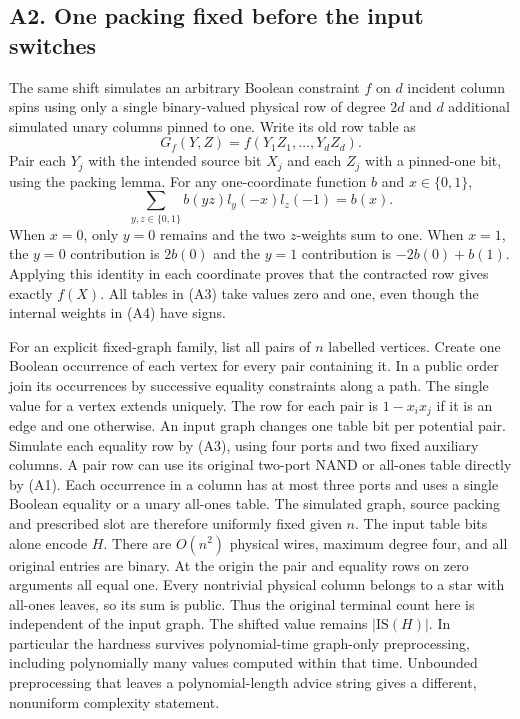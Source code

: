 \documentclass[11pt,a4paper]{article}
\begin{document}
\subsection{A2. One packing fixed before the input
switches}\label{v9-a2-one-packing-fixed-before-the-input-switches}

The same shift simulates an arbitrary Boolean constraint \(f\) on \(d\)
incident column spins using only a single binary-valued physical row of
degree \(2d\) and \(d\) additional simulated unary columns pinned to
one. Write its old row table as \[
       G_f(Y,Z)= f(Y_1Z_1,\ldots,Y_dZ_d).
\tag{A3}
\] Pair each \(Y_j\) with the intended source bit \(X_j\) and each
\(Z_j\) with a pinned-one bit, using the packing lemma. For any
one-coordinate function \(b\) and \(x\in\{0,1\}\), \[
        \sum_{y,z\in\{0,1\}} b(yz)l_y(-x)l_z(-1)=b(x).
\tag{A4}
\] When \(x=0\), only \(y=0\) remains and the two \(z\)-weights sum to
one. When \(x=1\), the \(y=0\) contribution is \(2b(0)\) and the \(y=1\)
contribution is \(-2b(0)+b(1)\). Applying this identity in each
coordinate proves that the contracted row gives exactly \(f(X)\). All
tables in (A3) take values zero and one, even though the internal
weights in (A4) have signs.

For an explicit fixed-graph family, list all pairs of \(n\) labelled
vertices. Create one Boolean occurrence of each vertex for every pair
containing it. In a public order join its occurrences by successive
equality constraints along a path. The single value for a vertex extends
uniquely. The row for each pair is \(1-x_ix_j\) if it is an edge and one
otherwise. An input graph changes one table bit per potential pair.
Simulate each equality row by (A3), using four ports and two fixed
auxiliary columns. A pair row can use its original two-port NAND or
all-ones table directly by (A1). Each occurrence in a column has at most
three ports and uses a single Boolean equality or a unary all-ones
table. The simulated graph, source packing and prescribed slot are
therefore uniformly fixed given \(n\). The input table bits alone encode
\(H\). There are \(O(n^2)\) physical wires, maximum degree four, and all
original entries are binary. At the origin the pair and equality rows on
zero arguments all equal one. Every nontrivial physical column belongs
to a star with all-ones leaves, so its sum is public. Thus the original
terminal count here is independent of the input graph. The shifted value
remains \(|\mathrm{IS}(H)|\). In particular the hardness survives
polynomial-time graph-only preprocessing, including polynomially many
values computed within that time. Unbounded preprocessing that leaves a
polynomial-length advice string gives a different, nonuniform complexity
statement.
\end{document}
